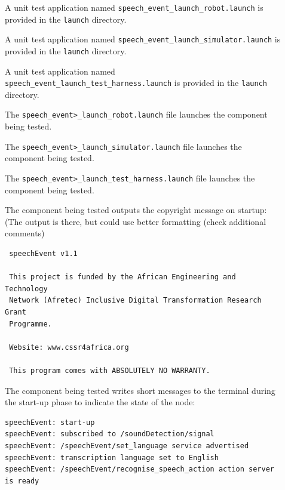 \documentclass{CSSRforAfrica}
\newcommand{\checkboxChecked}{\fbox{\ding{51}}} %
\newcommand{\checkboxDashed}{\fbox{--}}         %
\begin{document}
\begin{description}

\item[\checkboxDashed] A unit test application named {\small \verb+speech_event_launch_robot.launch+} is provided in the {\small \verb+launch+} directory.

\item[\checkboxDashed] A unit test application named {\small \verb+speech_event_launch_simulator.launch+} is provided in the {\small \verb+launch+} directory.

\item[\checkboxDashed] A unit test application named {\small \verb+speech_event_launch_test_harness.launch+} is provided in the {\small \verb+launch+} directory.

\item[\checkboxDashed] The {\small \verb+speech_event>_launch_robot.launch+} file launches the component being tested.

\item[\checkboxDashed] The {\small \verb+speech_event>_launch_simulator.launch+} file launches the component being tested.

\item[\checkboxDashed] The {\small \verb+speech_event>_launch_test_harness.launch+} file launches the component being tested.

\item[\checkboxChecked] The component being tested outputs the copyright message on startup: (The output is there, but could use better formatting (check additional comments)
{\small 
\begin{verbatim}
 speechEvent v1.1
 
 This project is funded by the African Engineering and Technology
 Network (Afretec) Inclusive Digital Transformation Research Grant
 Programme.
 
 Website: www.cssr4africa.org
 
 This program comes with ABSOLUTELY NO WARRANTY.
\end{verbatim}}

\item[\checkboxChecked]  The component being tested writes short messages to the terminal during the start-up phase to indicate the state of the node:
{\small 
\begin{verbatim}
speechEvent: start-up
speechEvent: subscribed to /soundDetection/signal
speechEvent: /speechEvent/set_language service advertised
speechEvent: transcription language set to English
speechEvent: /speechEvent/recognise_speech_action action server is ready
\end{verbatim}}


\end{description}
\end{document}

